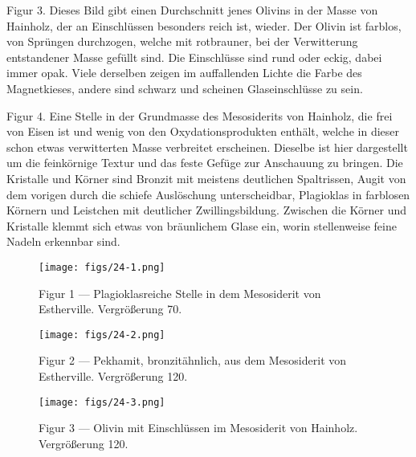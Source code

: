 \documentclass[a4paper, 12pt, oneside]{article}
\begin{document}
Figur 3. Dieses Bild gibt einen Durchschnitt jenes Olivins in der Masse von Hainholz, der an Einschlüssen besonders reich ist, wieder. Der Olivin ist farblos, von Sprüngen durchzogen, welche mit rotbrauner, bei der Verwitterung entstandener Masse gefüllt sind. Die Einschlüsse sind rund oder eckig, dabei immer opak. Viele derselben zeigen im auffallenden Lichte die Farbe des Magnetkieses, andere sind schwarz und scheinen Glaseinschlüsse zu sein.

Figur 4. Eine Stelle in der Grundmasse des Mesosiderits von Hainholz, die frei von Eisen ist und wenig von den Oxydationsprodukten enthält, welche in dieser schon etwas verwitterten Masse verbreitet erscheinen. Dieselbe ist hier dargestellt um die feinkörnige Textur und das feste Gefüge zur Anschauung zu bringen. Die Kristalle und Körner sind Bronzit mit meistens deutlichen Spaltrissen, Augit von dem vorigen durch die schiefe Auslöschung unterscheidbar, Plagioklas in farblosen Körnern und Leistchen mit deutlicher Zwillingsbildung. Zwischen die Körner und Kristalle klemmt sich etwas von bräunlichem Glase ein, worin stellenweise feine Nadeln erkennbar sind.
\clearpage

\vspace*{\fill}
\begin{figure}[H]
\centering
\texttt{[image: figs/24-1.png]}
\caption{\small Figur 1 --- Plagioklasreiche Stelle in dem Mesosiderit von Estherville. Vergrößerung 70.}
\end{figure}
\vspace*{\fill}
\clearpage

\vspace*{\fill}
\begin{figure}[H]
\centering
\texttt{[image: figs/24-2.png]}
\caption{\small Figur 2 --- Pekhamit, bronzitähnlich, aus dem Mesosiderit von Estherville. Vergrößerung 120.}
\end{figure}
\vspace*{\fill}
\clearpage

\vspace*{\fill}
\begin{figure}[H]
\centering
\texttt{[image: figs/24-3.png]}
\caption{\small Figur 3 --- Olivin mit Einschlüssen im Mesosiderit von Hainholz. Vergrößerung 120.}
\end{figure}
\vspace*{\fill}
\clearpage
\end{document}
